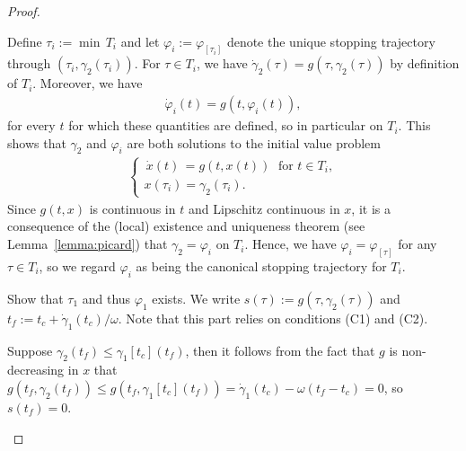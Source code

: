 \documentclass[a4paper]{article}
\theoremstyle{definition}
\theoremstyle{plain}
\begin{document}
\begin{proof}
\begin{outline}
  \2 Define $\tau_{i} := \min \, T_{i}$ and let $\varphi_{i} := \varphi_{[\tau_{i}]}$
  denote the unique stopping trajectory through $(\tau_{i}, \gamma_{2}(\tau_{i}))$.
  For $\tau \in T_{i}$, we have
  $\dot{\gamma}_{2}(\tau) = g(\tau, \gamma_{2}(\tau))$ by definition of $T_{i}$.
  Moreover, we have
  \begin{align}\label{eq:phi-tangent}
    \dot{\varphi}_{i}(t) = g(t, \varphi_{i}(t)),
  \end{align}
  for every $t$ for which these quantities are defined, so in particular on $T_{i}$.
  This shows that $\gamma_{2}$ and $\varphi_{i}$ are both solutions to the initial value problem
  \begin{align}
    \begin{cases}
      \,\dot{x}(t)\, = g(t, x(t)) \;  \text{ for } t \in T_{i} , \\
      x(\tau_{i}) = \gamma_{2}(\tau_{i}) .
    \end{cases}
  \end{align}
  Since $g(t, x)$ is continuous in $t$ and Lipschitz continuous in $x$, it is a
  consequence of the (local) existence and uniqueness theorem
  (see Lemma~\ref{lemma:picard}) that $\gamma_{2} = \varphi_{i}$ on $T_{i}$.
  Hence, we have $\varphi_{i} = \varphi_{[\tau]}$ for any $\tau \in T_{i}$, so we regard
  $\varphi_{i}$ as being the canonical stopping trajectory for $T_{i}$.


  \1 Show that $\tau_{1}$ and thus $\varphi_{1}$ exists. We write
  $s(\tau) := g(\tau, \gamma_{2}(\tau))$ and
  $t_{f} := t_{c} + \dot{\gamma}_{1}(t_{c}) / \omega$. Note that this part
  relies on conditions (C1) and (C2).

  \2 Suppose $\gamma_{2}(t_{f}) \leq \gamma_{1}[t_{c}](t_{f})$, then it follows from the fact
  that $g$ is non-decreasing in $x$ that
  $g(t_{f}, \gamma_{2}(t_{f})) \leq g(t_{f}, \gamma_{1}[t_{c}](t_{f})) = \dot{\gamma}_{1}(t_{c}) - \omega(t_{f} - t_{c}) = 0$,
  so $s(t_{f}) = 0$.


\end{outline}
\end{proof}
\end{document}
